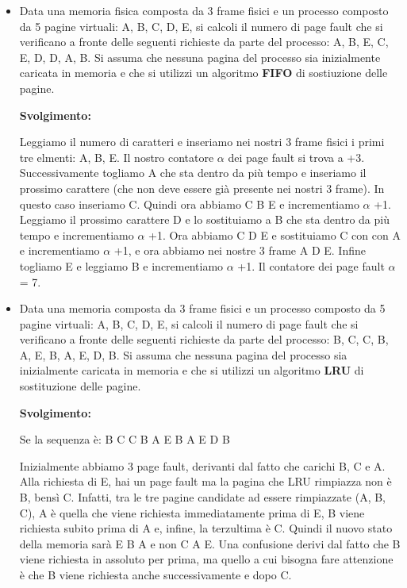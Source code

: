 \documentclass{article}
\begin{document}
\begin{itemize}
    \item Data una memoria fisica composta da 3 frame fisici e un processo composto da 5 pagine virtuali: A, B, C, D, E, si calcoli il numero di page fault che si verificano a fronte delle seguenti richieste da parte del processo: A, B, E, C, E, D, D, A, B. Si assuma che nessuna pagina del processo sia inizialmente caricata in memoria e che si utilizzi un algoritmo \textbf{FIFO} di sostiuzione delle pagine.\par
    \textbf{Svolgimento:}\par
    Leggiamo il numero di caratteri e inseriamo nei nostri 3 frame fisici i primi tre elmenti: A, B, E. Il nostro contatore $\alpha$ dei page fault si trova a +3. Successivamente togliamo A che sta dentro da più tempo e inseriamo il prossimo carattere (che non deve essere già presente nei nostri 3 frame). In questo caso inseriamo C. Quindi ora abbiamo C B E e incrementiamo $\alpha$ +1. Leggiamo il prossimo carattere D e lo sostituiamo a B che sta dentro da più tempo e incrementiamo $\alpha$ +1. Ora abbiamo C D E e sostituiamo C con con A e incrementiamo $\alpha$ +1, e ora abbiamo nei nostre 3 frame A D E. Infine togliamo E e leggiamo B e incrementiamo $\alpha$ +1. Il contatore dei page fault $\alpha$ = 7.
    \item Data una memoria composta da 3 frame fisici e un processo composto da 5 pagine virtuali: A, B, C, D, E, si calcoli il numero di page fault che si verificano a fronte delle seguenti richieste da parte del processo: B, C, C, B, A, E, B, A, E, D, B. Si assuma che nessuna pagina del processo sia inizialmente caricata in memoria e che si utilizzi un algoritmo \textbf{LRU} di sostituzione delle pagine.\par
    \textbf{Svolgimento:}\par
    Se la sequenza è: B C C B A E B A E D B\par
    Inizialmente abbiamo 3 page fault, derivanti dal fatto che carichi B, C e A.
    Alla richiesta di E, hai un page fault ma la pagina che LRU rimpiazza non è B, bensì C. Infatti, tra le tre pagine candidate ad essere rimpiazzate (A, B, C), A è quella che viene richiesta immediatamente prima di E, B viene richiesta subito prima di A e, infine, la terzultima è C. Quindi il nuovo stato della memoria sarà E B A e non C A E.
    Una confusione derivi dal fatto che B viene richiesta in assoluto per prima, ma quello a cui bisogna fare attenzione è che B viene richiesta anche successivamente e dopo C.\par
    \begin{center}

\end{center}
\end{itemize}
\end{document}
